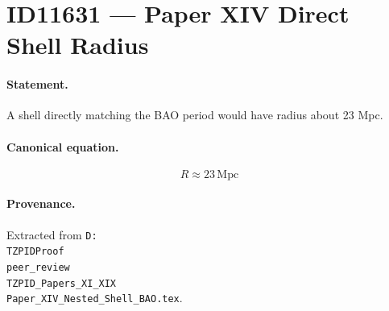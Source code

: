 \section*{ID11631 --- Paper XIV Direct Shell Radius}

\paragraph{Statement.}
A shell directly matching the BAO period would have radius about 23 Mpc.

\paragraph{Canonical equation.}
\[
R\approx23\,\mathrm{Mpc}
\]

\paragraph{Provenance.}
Extracted from \texttt{D:\\TZPIDProof\\peer\_review\\TZPID\_Papers\_XI\_XIX\\Paper\_XIV\_Nested\_Shell\_BAO.tex}.
